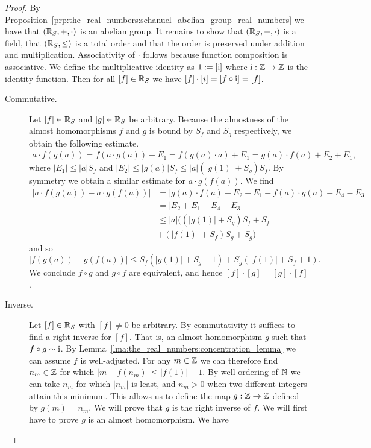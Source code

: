 \documentclass[../main.tex]{subfiles}
\begin{document}
\begin{proof}
    By Proposition~\ref{prp:the_real_numbers:schanuel_abelian_group_real_numbers} we have that $(\mathbb{R}_S,+,\cdot)$ is an abelian group. It remains to show that $(\mathbb{R}_S,+,\cdot)$ is a field, that $(\mathbb{R}_S,\leq)$ is a total order and that the order is preserved under addition and multiplication. Associativity of $\cdot$ follows because function composition is associative. We define the multiplicative identity as $1:=[\operatorname{i}]$ where $\operatorname{i}:\mathbb{Z}\to\mathbb{Z}$ is the identity function. Then for all $[f]\in\mathbb{R}_S$ we have $[f]\cdot[i]=[f\circ\operatorname{i}]=[f]$.
    \begin{description}
        \item[Commutative.] Let $[f]\in\mathbb{R}_S$ and $[g]\in\mathbb{R}_S$ be arbitrary. Because the almostness of the almost homomorphisms $f$ and $g$ is bound by $S_f$ and $S_g$ respectively, we obtain the following estimate.
        \begin{align*}
            a\cdot f(g(a))=f(a\cdot g(a))+E_1=f(g(a)\cdot a)+E_1=g(a)\cdot f(a)+E_2+E_1,
        \end{align*}
        where $\vert E_1\vert\leq\vert a\vert S_f$ and $\vert E_2\vert\leq\vert g(a)\vert S_f\leq\vert a\vert(\vert g(1)\vert+S_g)S_f$. By symmetry we obtain a similar estimate for $a\cdot g(f(a))$. We find
        \begin{align*}
            \vert a\cdot f(g(a))-a\cdot g(f(a))\vert & =\vert g(a)\cdot f(a)+E_2+E_1-f(a)\cdot g(a)-E_4-E_3\vert \\
            & =\vert E_2+E_1-E_4-E_3\vert \\
            & \leq\vert a\vert\bigl((\vert g(1)\vert+S_g)S_f+S_f \\
            & +(\vert f(1)\vert+S_f)S_g+S_g\bigr)
        \end{align*}
        and so
        \begin{equation*}
            \vert f(g(a))-g(f(a))\vert\leq S_f(\vert g(1)\vert+S_g+1)+S_g(\vert f(1)\vert+S_f+1).
        \end{equation*}
        We conclude $f\circ g$ and $g\circ f$ are equivalent, and hence $[f]\cdot[g]=[g]\cdot[f]$.
        \item[Inverse.] Let $[f]\in\mathbb{R}_S$ with $[f]\neq0$ be arbitrary. By commutativity it suffices to find a right inverse for $[f]$. That is, an almost homomorphism $g$ such that $f\circ g\sim\operatorname{i}$. By Lemma~\ref{lma:the_real_numbers:concentration_lemma} we can assume $f$ is well-adjusted. For any $m\in\mathbb{Z}$ we can therefore find $n_m\in\mathbb{Z}$ for which $\vert m-f(n_m)\vert\leq\vert f(1)\vert+1$. By well-ordering of $\mathbb{N}$ we can take $n_m$ for which $\vert n_m\vert$ is least, and $n_m>0$ when two different integers attain this minimum. This allows us to define the map $g:\mathbb{Z}\to\mathbb{Z}$ defined by $g(m)=n_m$. We will prove that $g$ is the right inverse of $f$. We will first have to prove $g$ is an almost homomorphism. We have

\end{description}
\end{proof}
\end{document}
